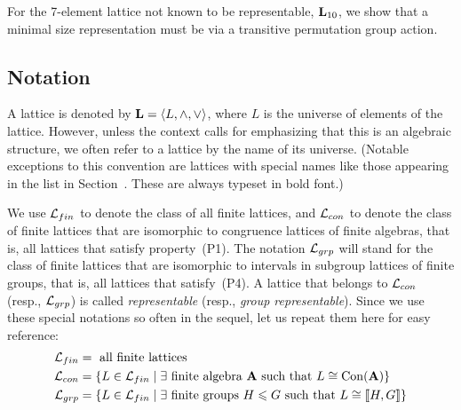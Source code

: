 For the 7-element lattice not known to be representable, 
$\mathbf{L}_{10}$, we show that a minimal size representation 
must be via a transitive permutation group action.
 











\subsection{Notation}
A lattice is denoted by $\mathbf{L} = \langle L, \wedge, \vee\rangle$, where $L$
is the universe of elements of the lattice.  However, unless the context
calls for emphasizing that this is an algebraic structure, we often
refer to a lattice by the name of its universe. (Notable exceptions to
this convention are lattices with special names like those appearing in the list in
Section~\label{sec:small-unary-algebras}. These are always typeset in bold font.)

We use $\mathcal{L}_{fin}$ to denote the class of all finite lattices, and 
$\mathcal{L}_{con}$ to denote the class of finite lattices that are isomorphic to congruence
lattices of finite algebras, that is, all lattices that satisfy property~(P1). 
The notation 
$\mathcal{L}_{grp}$ will stand for the class of finite lattices that
are isomorphic to intervals in subgroup lattices of finite groups, that is,
all lattices that satisfy~(P4). 
A lattice that belongs to $\mathcal{L}_{con}$ (resp., $\mathcal{L}_{grp}$) is called \emph{representable} (resp., 
\emph{group representable}).
Since we use these special notations so often in the sequel, let us repeat them here for easy reference:
\begin{align*}
  \sL_{fin} & = \text{ all finite lattices }\\
  \sL_{con} %
  &=\{L \in \sL_{fin} \mid \exists \text{ finite algebra $\bA$ such that $L \cong \Con(\bA)$}\}\\
  \sL_{grp} %
  &=\{L \in \sL_{fin} \mid \exists \text{ finite groups $H \leq G$ such that $L \cong \lb H, G\rb$}\}
\end{align*}

